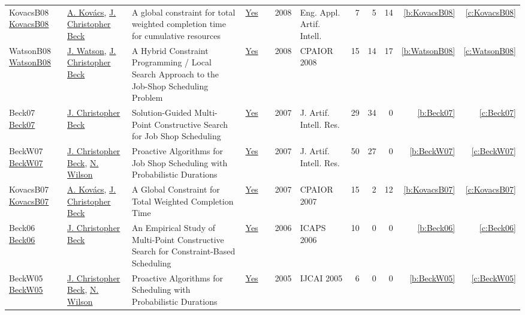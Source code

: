 {\begin{longtable}{>{\raggedright\arraybackslash}p{3cm}>{\raggedright\arraybackslash}p{6cm}>{\raggedright\arraybackslash}p{6.5cm}rrrp{2.5cm}rrrrr}
KovacsB08 \href{https://doi.org/10.1016/j.engappai.2008.03.004}{KovacsB08} & \hyperref[auth:a147]{A. Kov{\'{a}}cs}, \hyperref[auth:a89]{J. Christopher Beck} & A global constraint for total weighted completion time for cumulative resources & \href{works/KovacsB08.pdf}{Yes} & \cite{KovacsB08} & 2008 & Eng. Appl. Artif. Intell. & 7 & 5 & 14 & \ref{b:KovacsB08} & \ref{c:KovacsB08}\\
WatsonB08 \href{https://doi.org/10.1007/978-3-540-68155-7\_21}{WatsonB08} & \hyperref[auth:a366]{J. Watson}, \hyperref[auth:a89]{J. Christopher Beck} & A Hybrid Constraint Programming / Local Search Approach to the Job-Shop Scheduling Problem & \href{works/WatsonB08.pdf}{Yes} & \cite{WatsonB08} & 2008 & CPAIOR 2008 & 15 & 14 & 17 & \ref{b:WatsonB08} & \ref{c:WatsonB08}\\
Beck07 \href{https://doi.org/10.1613/jair.2169}{Beck07} & \hyperref[auth:a89]{J. Christopher Beck} & Solution-Guided Multi-Point Constructive Search for Job Shop Scheduling & \href{works/Beck07.pdf}{Yes} & \cite{Beck07} & 2007 & J. Artif. Intell. Res. & 29 & 34 & 0 & \ref{b:Beck07} & \ref{c:Beck07}\\
BeckW07 \href{https://doi.org/10.1613/jair.2080}{BeckW07} & \hyperref[auth:a89]{J. Christopher Beck}, \hyperref[auth:a838]{N. Wilson} & Proactive Algorithms for Job Shop Scheduling with Probabilistic Durations & \href{works/BeckW07.pdf}{Yes} & \cite{BeckW07} & 2007 & J. Artif. Intell. Res. & 50 & 27 & 0 & \ref{b:BeckW07} & \ref{c:BeckW07}\\
KovacsB07 \href{https://doi.org/10.1007/978-3-540-72397-4\_9}{KovacsB07} & \hyperref[auth:a147]{A. Kov{\'{a}}cs}, \hyperref[auth:a89]{J. Christopher Beck} & A Global Constraint for Total Weighted Completion Time & \href{works/KovacsB07.pdf}{Yes} & \cite{KovacsB07} & 2007 & CPAIOR 2007 & 15 & 2 & 12 & \ref{b:KovacsB07} & \ref{c:KovacsB07}\\
Beck06 \href{http://www.aaai.org/Library/ICAPS/2006/icaps06-028.php}{Beck06} & \hyperref[auth:a89]{J. Christopher Beck} & An Empirical Study of Multi-Point Constructive Search for Constraint-Based Scheduling & \href{works/Beck06.pdf}{Yes} & \cite{Beck06} & 2006 & ICAPS 2006 & 10 & 0 & 0 & \ref{b:Beck06} & \ref{c:Beck06}\\
BeckW05 \href{http://ijcai.org/Proceedings/05/Papers/0748.pdf}{BeckW05} & \hyperref[auth:a89]{J. Christopher Beck}, \hyperref[auth:a838]{N. Wilson} & Proactive Algorithms for Scheduling with Probabilistic Durations & \href{works/BeckW05.pdf}{Yes} & \cite{BeckW05} & 2005 & IJCAI 2005 & 6 & 0 & 0 & \ref{b:BeckW05} & \ref{c:BeckW05}\\

\end{longtable}}
